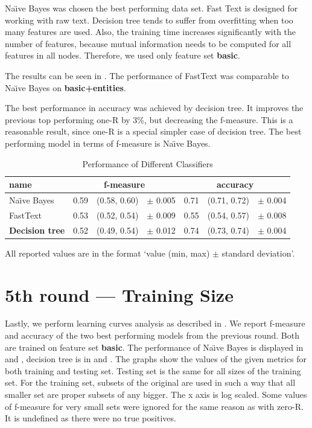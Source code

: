Na\"{\i}ve Bayes was chosen the best performing data set.
Fast Text is designed for working with raw text.
Decision tree tends to suffer from overfitting when too many features are used.
Also, the training time increases significantly with the number of features,
because mutual information needs to be computed for all features in all nodes.
Therefore, we used only feature set \textbf{basic}.

The results can be seen in .
The performance of FastText was comparable to Na\"{\i}ve Bayes on \textbf{basic+entities}.


The best performance in accuracy was achieved by decision tree.
It improves the previous top performing one-R by 3\%, but decreasing the f-measure.
This is a reasonable result, since one-R is a special simpler case of decision tree.
The best performing model in terms of f-measure is Na\"{\i}ve Bayes.


\begin{table}[h!]

\centering
\begin{tabular}{lr@{~}r@{~}rr@{~}r@{~}r}
\toprule
\textbf{name}	& \multicolumn{3}{c}{\textbf{f-measure}} & \multicolumn{3}{c}{\textbf{accuracy}} \\
\midrule

Na\"{\i}ve Bayes & 0.59 & (0.58, 0.60) & $\pm$ 0.005 & 0.71 & (0.71, 0.72) & $\pm$ 0.004		\\

FastText & 0.53 & (0.52, 0.54) & $\pm$ 0.009 & 0.55 & (0.54, 0.57) & $\pm$ 0.008 \\
\textbf{Decision tree} & 0.52 & (0.49, 0.54) & $\pm$ 0.012 & 0.74 & (0.73, 0.74) & $\pm$ 0.004 \\

\bottomrule
\end{tabular}

\caption{Performance of Different Classifiers}\label{tab:clsf_perf}
All reported values are in the format `value (min, max) $\pm$ standard deviation'.
\end{table}


\section{5th round --- Training Size}

Lastly, we perform learning curves analysis as described in .
We report f-measure and accuracy of the two best performing models from the previous round.
Both are trained on feature set \textbf{basic}.
The performance of Na\"{\i}ve Bayes is displayed in  and ,
decision tree is in  and .
The graphs show the values of the given metrics for both training and testing set.
Testing set is the same for all sizes of the training set.
For the training set, subsets of the original are used in such a way that 
all smaller set are proper subsets of any bigger.
The x axis is log scaled.
Some values of f-measure for very small sets were ignored for the same reason as with zero-R.
It is undefined as there were no true positives.

